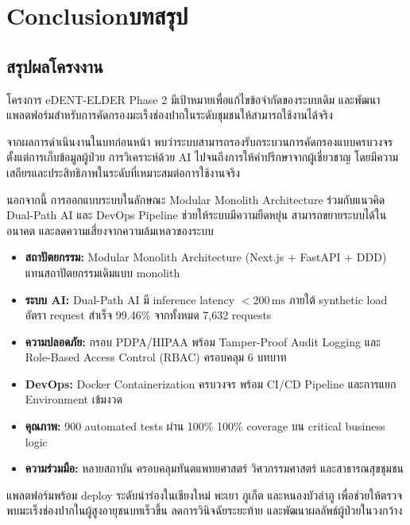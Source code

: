 \chapter{\ifenglish Conclusion\else บทสรุป\fi}

\section{สรุปผลโครงงาน}


โครงการ eDENT-ELDER Phase 2 มีเป้าหมายเพื่อแก้ไขข้อจำกัดของระบบเดิม
และพัฒนาแพลตฟอร์มสำหรับการคัดกรองมะเร็งช่องปากในระดับชุมชนให้สามารถใช้งานได้จริง

จากผลการดำเนินงานในบทก่อนหน้า พบว่าระบบสามารถรองรับกระบวนการคัดกรองแบบครบวงจร
ตั้งแต่การเก็บข้อมูลผู้ป่วย การวิเคราะห์ด้วย AI ไปจนถึงการให้คำปรึกษาจากผู้เชี่ยวชาญ
โดยมีความเสถียรและประสิทธิภาพในระดับที่เหมาะสมต่อการใช้งานจริง

นอกจากนี้ การออกแบบระบบในลักษณะ Modular Monolith Architecture
ร่วมกับแนวคิด Dual-Path AI และ DevOps Pipeline
ช่วยให้ระบบมีความยืดหยุ่น สามารถขยายระบบได้ในอนาคต
และลดความเสี่ยงจากความล้มเหลวของระบบ

\begin{tcolorbox}[bluebox, title=ผลสำเร็จหลัก]
  \begin{itemize}[leftmargin=1.4em, itemsep=5pt]
    \item \textbf{สถาปัตยกรรม:}
          Modular Monolith Architecture (Next.js + FastAPI + DDD) แทนสถาปัตยกรรมเดิมแบบ monolith
    \item \textbf{ระบบ AI:}
          Dual-Path AI มี inference latency $<200\,\text{ms}$ ภายใต้ synthetic load
          อัตรา request สำเร็จ 99.46\% จากทั้งหมด 7,632 requests
    \item \textbf{ความปลอดภัย:}
          กรอบ PDPA/HIPAA พร้อม Tamper-Proof Audit Logging
          และ Role-Based Access Control (RBAC) ครอบคลุม 6 บทบาท
    \item \textbf{DevOps:}
          Docker Containerization ครบวงจร พร้อม CI/CD Pipeline
          และการแยก Environment เข้มงวด
    \item \textbf{คุณภาพ:}
          900 automated tests ผ่าน 100\%
          100\% coverage บน critical business logic
    \item \textbf{ความร่วมมือ:}
          หลายสถาบัน ครอบคลุมทันตแพทยศาสตร์ วิศวกรรมศาสตร์ และสาธารณสุขชุมชน
  \end{itemize}
\end{tcolorbox}

แพลตฟอร์มพร้อม deploy ระดับนำร่องในเชียงใหม่ พะเยา ภูเก็ต และหนองบัวลำภู
เพื่อช่วยให้ตรวจพบมะเร็งช่องปากในผู้สูงอายุชนบทเร็วขึ้น
ลดการวินิจฉัยระยะท้าย และพัฒนาผลลัพธ์ผู้ป่วยในวงกว้าง

